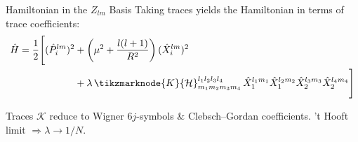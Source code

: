 \documentclass{beamer}
\newcommand{\Tr}{\mathrm{Tr}\,}
\begin{document}
\begin{frame}{Hamiltonian in the $Z_{lm}$ Basis}
  Taking traces yields the Hamiltonian in terms of trace coefficients:
  \begin{align*}
    \hat H = \frac{1}{2}\Bigg[ (\hat P_i^{lm})^2
      &+ \left(\mu^2 + \frac{l(l+1)}{R^2}\right)(\hat X_i^{lm})^2 \\
      &+ \lambda\,\tikzmarknode{K}{\mathcal{H}}^{l_1 l_2 l_3 l_4}_{m_1 m_2 m_3 m_4}\,
        \hat X_1^{l_1 m_1}\hat X_1^{l_2 m_2}\hat X_2^{l_3 m_3}\hat X_2^{l_4 m_4} \Bigg]
  \end{align*}

  \vspace{2.2cm}

  {\footnotesize Traces $\mathcal{K}$ reduce to Wigner $6j$-symbols \& Clebsch--Gordan coefficients. 't Hooft limit $\Rightarrow \lambda\to 1/N$.}
\end{frame}
\end{document}
